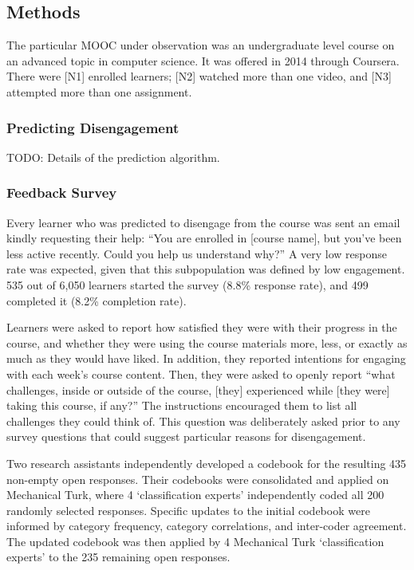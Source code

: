 \documentclass{sigchi}\usepackage[]{graphicx}\usepackage[]{color}
\begin{document}
\subsection{Methods}

The particular MOOC under observation was an undergraduate level course on an advanced topic in computer science. It was offered in 2014 through Coursera. There were [N1] enrolled learners; [N2] watched more than one video, and [N3] attempted more than one assignment.

\subsubsection{Predicting Disengagement}

TODO: Details of the prediction algorithm.

\subsubsection{Feedback Survey}

Every learner who was predicted to disengage from the course was sent an email kindly requesting their help: ``You are enrolled in [course name], but you've been less active recently. Could you help us understand why?'' A very low response rate was expected, given that this subpopulation was defined by low engagement. 535 out of 6,050 learners started the survey (8.8\% response rate), and 499 completed it (8.2\% completion rate).

Learners were asked to report how satisfied they were with their progress in the course, and whether they were using the course materials more, less, or exactly as much as they would have liked. In addition, they reported intentions for engaging with each week's course content. Then, they were asked to openly report ``what challenges, inside or outside of the course, [they] experienced while [they were] taking this course, if any?'' The instructions encouraged them to list all challenges they could think of. This question was deliberately asked prior to any survey questions that could suggest particular reasons for disengagement.

Two research assistants independently developed a codebook for the resulting 435 non-empty open responses. Their codebooks were consolidated and applied on Mechanical Turk, where 4 `classification experts' independently coded all 200 randomly selected responses. Specific updates to the initial codebook were informed by category frequency, category correlations, and inter-coder agreement. The updated codebook was then applied by 4 Mechanical Turk `classification experts' to the 235 remaining open responses.
\end{document}
